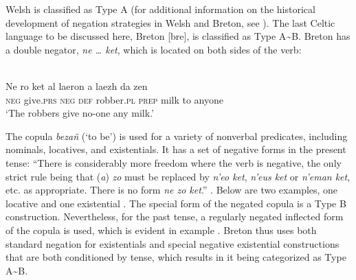 \documentclass[output=paper]{langsci/langscibook}
\begin{document}
%
Welsh is classified as Type A (for additional information on the
historical development of negation strategies in Welsh and Breton, see
\citealt{Willis2013}). The last Celtic language to be discussed here,
Breton [bre], is classified as Type A{\textasciitilde}B. Breton has a double negator, \textit{ne … ket}, which is located on both sides of the verb:
%
\begin{exe}\ex
{}\\
    \gll Ne ro ket al laeron a laezh da zen \\
\textsc{neg} give.\textsc{prs} \textsc{neg} \textsc{def} robber.\textsc{pl} \textsc{prep} milk  to anyone \\
    \glt `The robbers give no-one any milk.' 
    \end{exe}
%
The copula \textit{bezañ} (`to be') \parencite[144ff]{Press1986} is used
for a variety of nonverbal predicates, including nominals, locatives, and
existentials. It has a set of negative forms in the present tense: “There
is considerably more freedom where the verb is negative, the only strict
rule being that (\textit{a}) \textit{zo} must be replaced by \textit{n'eo
ket}, \textit{n'eus ket} or \textit{n'eman ket}, etc. as appropriate. There
is no form \textit{ne zo ket}.” \citep[152]{Press1986}. Below are two
examples, one locative  and one existential
. The special form of the negated copula is a
Type B construction. Nevertheless, for the past tense, a regularly negated
inflected form of the copula is used, which is evident in example
. Breton thus uses both standard negation for existentials and special negative existential constructions that are both conditioned by tense, which results in it being categorized as Type A{\textasciitilde}B.
%
\end{document}
